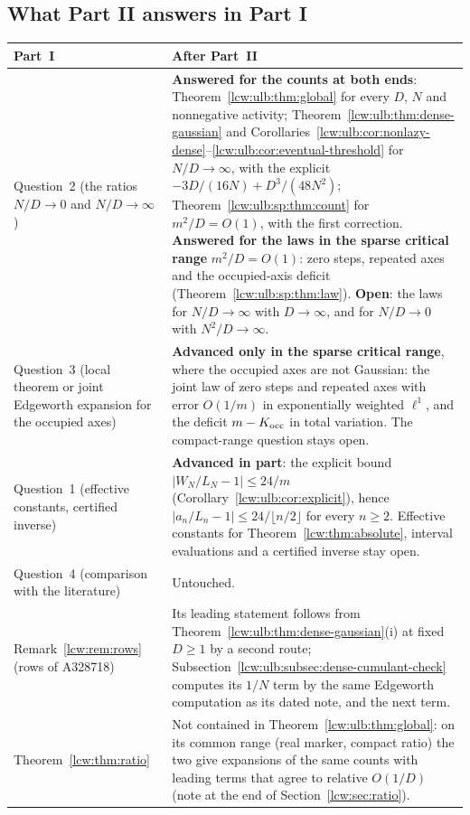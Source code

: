\documentclass[11pt,letterpaper]{article}
\theoremstyle{remark}\newtheorem{remark}[theorem]{Remark}
\begin{document}
\subsection{What Part II answers in Part I}\label{lcw:ulb:sec:answers}

\begingroup\small
\renewcommand{\arraystretch}{1.12}
\renewcommand{\theHtable}{lcwulb.answers}%
\begin{longtable}{@{}>{\raggedright\arraybackslash}p{}>{\raggedright\arraybackslash}p{}@{}}
\toprule
Part~I & After Part~II\\
\midrule
\endhead
Question~2 (the ratios $N/D\to0$ and $N/D\to\infty$) & \textbf{Answered for the counts at both ends}: Theorem~\ref{lcw:ulb:thm:global} for every $D$, $N$ and nonnegative activity; Theorem~\ref{lcw:ulb:thm:dense-gaussian} and Corollaries~\ref{lcw:ulb:cor:nonlazy-dense}--\ref{lcw:ulb:cor:eventual-threshold} for $N/D\to\infty$, with the explicit $-3D/(16N)+D^3/(48N^2)$; Theorem~\ref{lcw:ulb:sp:thm:count} for $m^2/D=O(1)$, with the first correction. \textbf{Answered for the laws in the sparse critical range} $m^2/D=O(1)$: zero steps, repeated axes and the occupied-axis deficit (Theorem~\ref{lcw:ulb:sp:thm:law}). \textbf{Open}: the laws for $N/D\to\infty$ with $D\to\infty$, and for $N/D\to0$ with $N^2/D\to\infty$.\\
Question~3 (local theorem or joint Edgeworth expansion for the occupied axes) & \textbf{Advanced only in the sparse critical range}, where the occupied axes are not Gaussian: the joint law of zero steps and repeated axes with error $O(1/m)$ in exponentially weighted $\ell^1$, and the deficit $m-K_{\rm occ}$ in total variation. The compact-range question stays open.\\
Question~1 (effective constants, certified inverse) & \textbf{Advanced in part}: the explicit bound $|W_N/L_N-1|\le24/m$ (Corollary~\ref{lcw:ulb:cor:explicit}), hence $|a_n/L_n-1|\le24/\lfloor n/2\rfloor$ for every $n\ge2$. Effective constants for Theorem~\ref{lcw:thm:absolute}, interval evaluations and a certified inverse stay open.\\
Question~4 (comparison with the literature) & Untouched.\\
Remark~\ref{lcw:rem:rows} (rows of A328718) & Its leading statement follows from Theorem~\ref{lcw:ulb:thm:dense-gaussian}(i) at fixed $D\ge1$ by a second route; Subsection~\ref{lcw:ulb:subsec:dense-cumulant-check} computes its $1/N$ term by the same Edgeworth computation as its dated note, and the next term.\\
Theorem~\ref{lcw:thm:ratio} & Not contained in Theorem~\ref{lcw:ulb:thm:global}: on its common range (real marker, compact ratio) the two give expansions of the same counts with leading terms that agree to relative $O(1/D)$ (note at the end of Section~\ref{lcw:sec:ratio}).\\
\bottomrule
\end{longtable}
\addtocounter{table}{-1}%
\endgroup
\end{document}
